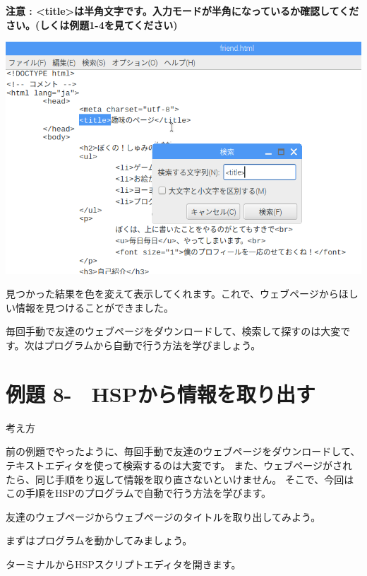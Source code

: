 \documentclass[a4paper,12pt,dvipdfmx]{jarticle}
\newcounter{Exercise}
\renewcommand\theExercise{例題 8-\arabic{Exercise}}
\begin{document}
{\bfseries
注意 :
{\textless}title{\textgreater}は半角文字です。入力モードが半角になっているか確認してください。(しくは例題1-4を見てください)}



\begin{center}
\includegraphics[width=16.625cm]{textbook-img012.png}

\end{center}
見つかった結果を色を変えて表示してくれます。これで、ウェブページからほしい情報を見つけることができました。


\bigskip

毎回手動で友達のウェブページをダウンロードして、検索して探すのは大変です。次はプログラムから自動で行う方法を学びましょう。
\clearpage\section{\theExercise　HSPから情報を取り出す}
\addtocounter{Exercise}{-1}\label{E:SCRAPING}
考え方

前の例題でやったように、毎回手動で友達のウェブページをダウンロードして、テキストエディタを使って検索するのは大変です。
また、ウェブページがされたら、同じ手順をり返して情報を取り直さないといけません。
そこで、今回はこの手順をHSPのプログラムで自動で行う方法を学びます。

友達のウェブページからウェブページのタイトルを取り出してみよう。

まずはプログラムを動かしてみましょう。

ターミナルからHSPスクリプトエディタを開きます。
\end{document}
